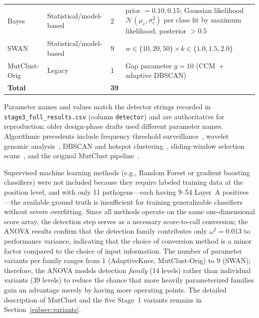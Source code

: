 \begin{table}[htbp]
{\begin{tabular}{llll}
Bayes & Statistical/model-based & 2 & prior $= 0.10, 0.15$; Gaussian likelihood $\mathcal{N}(\mu_c, \sigma_c^2)$ per class fit by maximum likelihood, posterior $> 0.5$ \\
SWAN & Statistical/model-based & 9 & $w \in \{10, 20, 50\} \times k \in \{1.0, 1.5, 2.0\}$ \\
MutClust-Orig & Legacy & 1 & Gap parameter $g = 10$ (CCM~+ adaptive DBSCAN) \\
\midrule
\textbf{Total} & & \textbf{39} & \\
\bottomrule
\end{tabular}
}
\begin{minipage}{\textwidth}
\smallskip
\footnotesize Parameter names and values match the detector strings recorded in \texttt{stage3\_full\_results.csv} (column \texttt{detector}) and are authoritative for reproduction; older design-phase drafts used different parameter names. Algorithmic precedents include frequency threshold surveillance~\cite{mercatelli2020geographic}, wavelet genomic analysis~\cite{anastassiou2001genomic,arneodo2011wavelet}, DBSCAN and hotspot clustering~\cite{ester1996dbscan,tokheim2016hotmaps}, sliding-window selection scans~\cite{tajima1989statistical}, and the original MutClust pipeline~\cite{youn2025mutclust}.
\end{minipage}
\end{table}

Supervised machine learning methods (e.g., Random Forest or gradient boosting classifiers) were not included because they require labeled training data at the position level, and with only 11 pathogens---each having 9--54 Layer~A positives---the available ground truth is insufficient for training generalizable classifiers without severe overfitting.
Since all methods operate on the same one-dimensional score array, the detection step serves as a necessary score-to-call conversion; the ANOVA results confirm that the detection family contributes only $\omega^2 = 0.013$ to performance variance, indicating that the choice of conversion method is a minor factor compared to the choice of input information.
The number of parameter variants per family ranges from 1 (AdaptiveKnee, MutClust-Orig) to 9 (SWAN); therefore, the ANOVA models detection \textit{family} (14 levels) rather than individual variants (39 levels) to reduce the chance that more heavily parameterized families gain an advantage merely by having more operating points.
The detailed description of MutClust and the five Stage~1 variants remains in Section~\ref{subsec:variants}.

